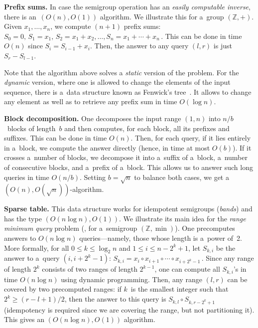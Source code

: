 \documentclass{toc}
\begin{document}
\textbf{Prefix sums.} In case the semigroup operation has an \emph{easily
    computable inverse}, there is an~$(O(n), O(1))$ algorithm. We
illustrate this for a~group $(\mathbb{Z}, +)$. Given $x_1, \dotsc, x_n$, we
compute $(n+1)$ prefix sums:
\(S_0=0,\, S_1=x_1,\, S_2=x_1+x_2, \dotsc, S_n=x_1+\dotsb+x_n\,.\)
This can be done in time $O(n)$ since $S_i=S_{i-1}+x_i$. Then, the answer to any
query $(l,r)$ is just $S_r-S_{l-1}$.

Note that the algorithm above solves a \emph{static} version of the problem. For
the \emph{dynamic} version, where one is allowed to change the elements of the
input sequence, there is a~data structure known as Fenwick's
tree~\cite{DBLP:journals/spe/Fenwick94}. It allows to change any element as well
as to retrieve any prefix sum in time $O(\log n)$.

\textbf{Block decomposition.} One decomposes the input range $(1,n)$ into
$n/b$~blocks of length~$b$ and then computes, for each block, all its prefixes
and suffixes. This can be done in time $O(n)$. Then, for each query, if it lies
entirely in a~block, we compute the answer directly (hence, in time at most
$O(b)$). If it crosses a~number of blocks, we decompose it into a~suffix of
a~block, a~number of consecutive blocks, and a~prefix of a~block. This allows us
to answer such long queries in time $O(n/b)$. Setting $b=\sqrt{n}$ to balance
both cases, we get a~$(O(n), O(\sqrt{n}))$-algorithm.

\textbf{Sparse table.} This data structure works for idempotent semigroups
(\emph{bands}) and has the type $(O(n\log n), O(1))$. We illustrate its main idea
for the \emph{range minimum query}
problem %
(\ie, for a~semigroup
$(\mathbb{Z}, \min)$). One precomputes answers to $O(n\log n)$ queries---namely,
those whose length is a~power of~2. More formally, for all $0 \le k \le \log_2n$
and $1 \le i \le n-2^k+1$, let $S_{k,i}$ be the answer to a~query $(i, i+2^k-1)$:
\(S_{k,i}=x_i \circ x_{i+1} \circ \dotsb \circ x_{i+2^k-1} \, .\)
Since any range of length $2^k$ consists of two ranges of length $2^{k-1}$, one
can compute all $S_{k,i}$'s in time $O(n\log n)$ using dynamic programming.
Then, any range $(l,r)$ can be covered by two precomputed ranges: if $k$~is the
smallest integer such that $2^k \ge (r-l+1)/2$, then the answer to this query
is $S_{k,l} \circ S_{k,r-2^k+1}$ (idempotency is required since we are covering
the range, but not partitioning it). This gives an $(O(n\log n), O(1))$
algorithm.
\end{document}
